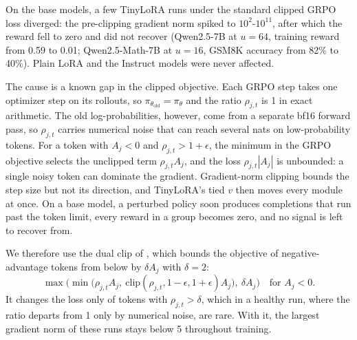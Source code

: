\documentclass[twoside]{article}
\begin{document}
On the base models, a few TinyLoRA runs under the standard clipped GRPO loss diverged: the pre-clipping gradient norm spiked to $10^2$-$10^{11}$, after which the reward fell to zero and did not recover (Qwen2.5-7B at $u = 64$, training reward from 0.59 to 0.01; Qwen2.5-Math-7B at $u = 16$, GSM8K accuracy from 82\% to 40\%). Plain LoRA and the Instruct models were never affected.

The cause is a known gap in the clipped objective. Each GRPO step takes one optimizer step on its rollouts, so $\pi_{\theta_\mathrm{old}} = \pi_\theta$ and the ratio $\rho_{j,t}$ is 1 in exact arithmetic. The old log-probabilities, however, come from a separate bf16 forward pass, so $\rho_{j,t}$ carries numerical noise that can reach several nats on low-probability tokens. For a token with $A_j < 0$ and $\rho_{j,t} > 1 + \epsilon$, the minimum in the GRPO objective selects the unclipped term $\rho_{j,t} A_j$, and the loss $\rho_{j,t} |A_j|$ is unbounded: a single noisy token can dominate the gradient. Gradient-norm clipping bounds the step size but not its direction, and TinyLoRA's tied $v$ then moves every module at once. On a base model, a perturbed policy soon produces completions that run past the token limit, every reward in a group becomes zero, and no signal is left to recover from.

We therefore use the dual clip of \citet{ye2020mastering}, which bounds the objective of negative-advantage tokens from below by $\delta A_j$ with $\delta = 2$:
\begin{equation}
    \max\!\big( \min\!\big( \rho_{j,t} A_j,\ \mathrm{clip}(\rho_{j,t}, 1 - \epsilon, 1 + \epsilon) A_j \big),\ \delta A_j \big) \quad \text{for } A_j < 0.
\end{equation}
It changes the loss only of tokens with $\rho_{j,t} > \delta$, which in a healthy run, where the ratio departs from 1 only by numerical noise, are rare. With it, the largest gradient norm of these runs stays below 5 throughout training.
\end{document}
